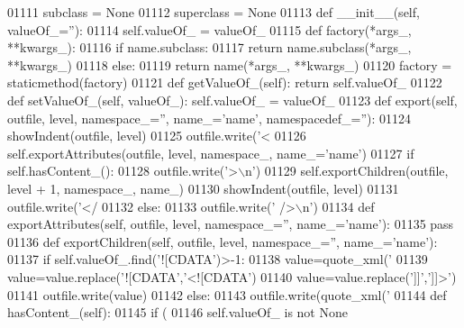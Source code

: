 \begin{DoxyCode}
{{{{{{{{{{{{{{{{{{{{{{{{{{{{{{{{{{{{{{{{{{{{{{{{{{{{{{{{01111     subclass = \textcolor{keywordtype}{None}
01112     superclass = \textcolor{keywordtype}{None}
01113     \textcolor{keyword}{def }__init__(self, valueOf\_=''):
01114         self.valueOf_ = valueOf\_
01115     \textcolor{keyword}{def }factory(*args\_, **kwargs\_):
01116         \textcolor{keywordflow}{if} name.subclass:
01117             \textcolor{keywordflow}{return} name.subclass(*args\_, **kwargs\_)
01118         \textcolor{keywordflow}{else}:
01119             \textcolor{keywordflow}{return} name(*args\_, **kwargs\_)
01120     factory = staticmethod(factory)
01121     \textcolor{keyword}{def }getValueOf_(self): \textcolor{keywordflow}{return} self.valueOf\_
01122     \textcolor{keyword}{def }setValueOf_(self, valueOf\_): self.valueOf\_ = valueOf\_
01123     \textcolor{keyword}{def }export(self, outfile, level, namespace\_='', name\_='name', namespacedef\_=''):
01124         showIndent(outfile, level)
01125         outfile.write(\textcolor{stringliteral}{'<%
01126         self.exportAttributes(outfile, level, namespace\_, name\_=\textcolor{stringliteral}{'name'})
01127         \textcolor{keywordflow}{if} self.hasContent_():
01128             outfile.write(\textcolor{stringliteral}{'>\(\backslash\)n'})
01129             self.exportChildren(outfile, level + 1, namespace\_, name\_)
01130             showIndent(outfile, level)
01131             outfile.write(\textcolor{stringliteral}{'</%
01132         \textcolor{keywordflow}{else}:
01133             outfile.write(\textcolor{stringliteral}{' />\(\backslash\)n'})
01134     \textcolor{keyword}{def }exportAttributes(self, outfile, level, namespace\_='', name\_='name'):
01135         \textcolor{keywordflow}{pass}
01136     \textcolor{keyword}{def }exportChildren(self, outfile, level, namespace\_='', name\_='name'):
01137         \textcolor{keywordflow}{if} self.valueOf\_.find(\textcolor{stringliteral}{'![CDATA'})>-1:
01138             value=quote_xml(\textcolor{stringliteral}{'%
01139             value=value.replace(\textcolor{stringliteral}{'![CDATA'},\textcolor{stringliteral}{'<![CDATA'})
01140             value=value.replace(\textcolor{stringliteral}{']]'},\textcolor{stringliteral}{']]>'})
01141             outfile.write(value)
01142         \textcolor{keywordflow}{else}:
01143             outfile.write(quote_xml(\textcolor{stringliteral}{'%
01144     \textcolor{keyword}{def }hasContent_(self):
01145         \textcolor{keywordflow}{if} (
01146             self.valueOf_ \textcolor{keywordflow}{is} \textcolor{keywordflow}{not} \textcolor{keywordtype}{None}
}}}}}}}}}}}}}}}}}}}}}}}}}}}}}}}}}}}}}}}}}}}}}}}}}}}}}}}}}}}}
\end{DoxyCode}
